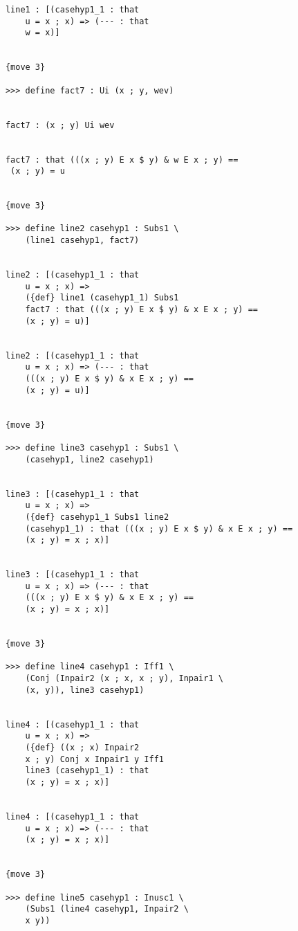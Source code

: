 \documentclass[12pt]{article}
\begin{document}
\begin{verbatim}
            line1 : [(casehyp1_1 : that 
                u = x ; x) => (--- : that 
                w = x)]


            {move 3}

            >>> define fact7 : Ui (x ; y, wev)


            fact7 : (x ; y) Ui wev


            fact7 : that (((x ; y) E x $ y) & w E x ; y) == 
             (x ; y) = u


            {move 3}

            >>> define line2 casehyp1 : Subs1 \
                (line1 casehyp1, fact7)


            line2 : [(casehyp1_1 : that 
                u = x ; x) => 
                ({def} line1 (casehyp1_1) Subs1 
                fact7 : that (((x ; y) E x $ y) & x E x ; y) == 
                (x ; y) = u)]


            line2 : [(casehyp1_1 : that 
                u = x ; x) => (--- : that 
                (((x ; y) E x $ y) & x E x ; y) == 
                (x ; y) = u)]


            {move 3}

            >>> define line3 casehyp1 : Subs1 \
                (casehyp1, line2 casehyp1)


            line3 : [(casehyp1_1 : that 
                u = x ; x) => 
                ({def} casehyp1_1 Subs1 line2 
                (casehyp1_1) : that (((x ; y) E x $ y) & x E x ; y) == 
                (x ; y) = x ; x)]


            line3 : [(casehyp1_1 : that 
                u = x ; x) => (--- : that 
                (((x ; y) E x $ y) & x E x ; y) == 
                (x ; y) = x ; x)]


            {move 3}

            >>> define line4 casehyp1 : Iff1 \
                (Conj (Inpair2 (x ; x, x ; y), Inpair1 \
                (x, y)), line3 casehyp1)


            line4 : [(casehyp1_1 : that 
                u = x ; x) => 
                ({def} ((x ; x) Inpair2 
                x ; y) Conj x Inpair1 y Iff1 
                line3 (casehyp1_1) : that 
                (x ; y) = x ; x)]


            line4 : [(casehyp1_1 : that 
                u = x ; x) => (--- : that 
                (x ; y) = x ; x)]


            {move 3}

            >>> define line5 casehyp1 : Inusc1 \
                (Subs1 (line4 casehyp1, Inpair2 \
                x y))



\end{verbatim}
\end{document}
